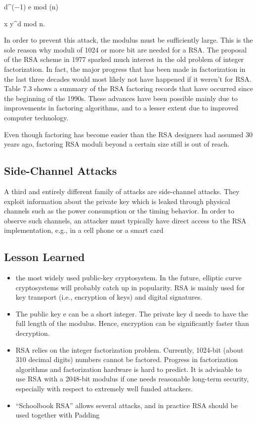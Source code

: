 \documentclass{article}
\begin{document}
d^(−1) \equiv e mod \phi(n)


x \equiv y^d mod n.


In order to prevent this attack, the modulus must be sufficiently large. This is the
sole reason why moduli of 1024 or more bit are needed for a RSA. The proposal of
the RSA scheme in 1977 sparked much interest in the old problem of integer factorization. In fact, the major progress that has been made in factorization in the last
three decades would most likely not have happened if it weren’t for RSA. Table 7.3
shows a summary of the RSA factoring records that have occurred since the beginning of the 1990s. These advances have been possible mainly due to improvements
in factoring algorithms, and to a lesser extent due to improved computer technology.

Even though factoring has become easier than the RSA designers had assumed 30
years ago, factoring RSA moduli beyond a certain size still is out of reach.


\subsection{Side-Channel Attacks}



A third and entirely different family of attacks are side-channel attacks. They exploit
information about the private key which is leaked through physical channels such as
the power consumption or the timing behavior. In order to observe such channels, an
attacker must typically have direct access to the RSA implementation, e.g., in a cell
phone or a smart card

\subsection{Lesson Learned}
\begin{itemize}

\item the most widely used public-key cryptosystem. In the future, elliptic
curve cryptosystems will probably catch up in popularity.
 RSA is mainly used for key transport (i.e., encryption of keys) and digital signatures.
 \item 
 The public key e can be a short integer. The private key d needs to have the
full length of the modulus. Hence, encryption can be significantly faster than
decryption.
\item 
 RSA relies on the integer factorization problem. Currently, 1024-bit (about 310
decimal digits) numbers cannot be factored. Progress in factorization algorithms
and factorization hardware is hard to predict. It is advisable to use RSA with
a 2048-bit modulus if one needs reasonable long-term security, especially with
respect to extremely well funded attackers.
\item 
 “Schoolbook RSA” allows several attacks, and in practice RSA should be used
together with Padding
\end{itemize}
\end{document}
